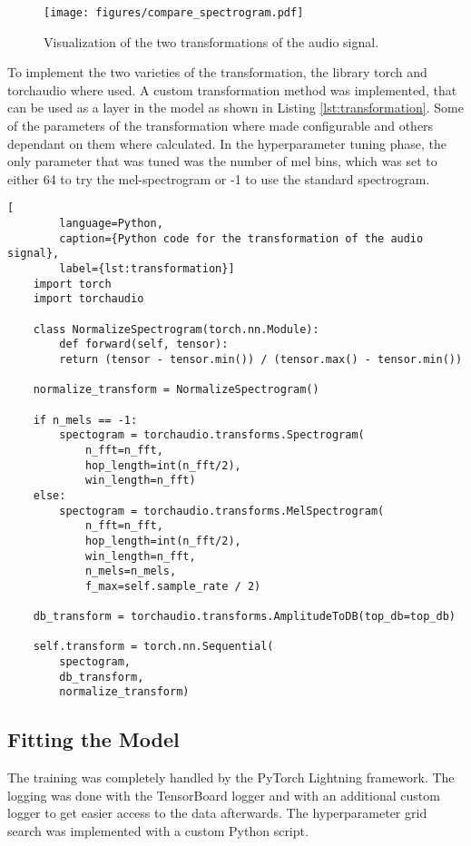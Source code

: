 \begin{figure}[h!]
    \centering
    \captionsetup{width=.7\linewidth}
    \texttt{[image: figures/compare\_spectrogram.pdf]}
    \caption{Visualization of the two transformations of the audio signal.}
    \label{fig:transformations}
\end{figure}

To implement the two varieties of the transformation, the library torch and torchaudio where used.
A custom transformation method was implemented, that can be used as a layer in the model as shown in 
Listing \ref{lst:transformation}. Some of the parameters of the transformation where made configurable
and others dependant on them where calculated. In the hyperparameter tuning phase, the only parameter
that was tuned was the number of mel bins, which was set to either 64 to try the mel-spectrogram or -1
to use the standard spectrogram.

    \begin{lstlisting}[
        language=Python, 
        caption={Python code for the transformation of the audio signal}, 
        label={lst:transformation}]
    import torch
    import torchaudio

    class NormalizeSpectrogram(torch.nn.Module):
        def forward(self, tensor):
        return (tensor - tensor.min()) / (tensor.max() - tensor.min())

    normalize_transform = NormalizeSpectrogram()

    if n_mels == -1:
        spectogram = torchaudio.transforms.Spectrogram(
            n_fft=n_fft, 
            hop_length=int(n_fft/2), 
            win_length=n_fft)
    else:
        spectogram = torchaudio.transforms.MelSpectrogram(
            n_fft=n_fft,
            hop_length=int(n_fft/2),
            win_length=n_fft,
            n_mels=n_mels,
            f_max=self.sample_rate / 2)

    db_transform = torchaudio.transforms.AmplitudeToDB(top_db=top_db)

    self.transform = torch.nn.Sequential(
        spectogram, 
        db_transform, 
        normalize_transform)
    \end{lstlisting}


\subsection{Fitting the Model}

The training was completely handled by the PyTorch Lightning framework. The logging was done
with the TensorBoard logger and with an additional custom logger to get easier access to the
data afterwards. The hyperparameter grid search was implemented with a custom Python script.


